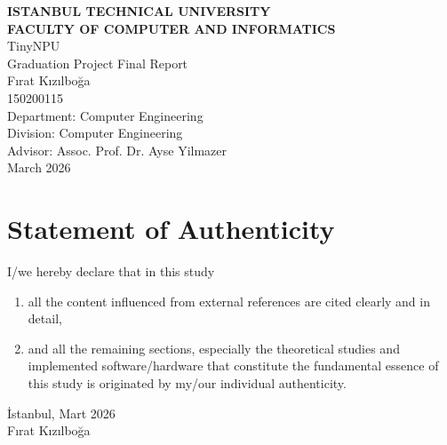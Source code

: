 \documentclass[a4paper, 12pt, titlepage]{article}
\title{\thetitle}
\author{\theauthor}
\date{\thedate}
\newcommand{\thetitle}{TinyNPU}
\newcommand{\theauthor}{Fırat Kızılboğa}
\newcommand{\thestudentid}{150200115}
\newcommand{\thedate}{March 2026}
\newcommand{\theturkishdate}{Mart 2026}
\newcommand{\theadvisor}{Assoc. Prof. Dr. Ayse Yilmazer}
\begin{document}
\shorthandoff{=}


\begin{titlepage}
    \bfseries %
    \sffamily %
    \begin{center}
        \LARGE{\textbf{ISTANBUL TECHNICAL UNIVERSITY \\ 
               FACULTY OF COMPUTER AND INFORMATICS} } \\
        \vspace{5.5cm}
        \LARGE{\thetitle}  \\
        \vspace{4.5cm}
        \Large{Graduation Project Final Report} \\
        \vspace{0.5cm}
        \Large{\theauthor} \\
        \Large{\thestudentid} \\
        \vspace{4cm}
        \large{Department: Computer Engineering} \\
        \large{Division: Computer Engineering} \\
        \vspace{1.5cm}
        \large{Advisor: \theadvisor} \\
        \vspace{\fill} %
        \large{\normalfont \sffamily \thedate}
    \end{center}
\end{titlepage}

\newpage
\section*{Statement of Authenticity}
I/we hereby declare that in this study
\begin{enumerate}
    \item all the content influenced from external references are cited clearly and in detail,
    \item and all the remaining sections, especially the theoretical studies and implemented software/hardware that constitute the fundamental essence of this study is originated by my/our individual authenticity.
\end{enumerate}
\vspace{1em}
İstanbul, \theturkishdate
\vspace{3em}\\ \theauthor
\end{document}
